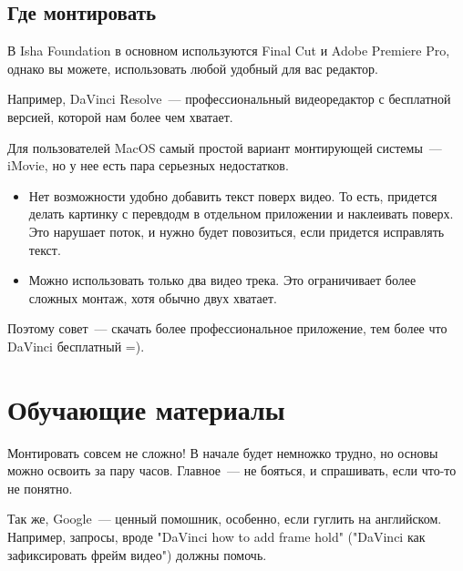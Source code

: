 \documentclass[
a4paper, %
12pt, %
article,
onecolumn, %
openany, %
]{memoir}
\begin{document}
\subsection{Где монтировать}
В Isha Foundation в основном используются Final Cut и Adobe Premiere Pro,
однако вы можете, использовать любой удобный для вас редактор.

Например, DaVinci Resolve~---
профессиональный видеоредактор с бесплатной версией, которой нам более чем хватает.

Для пользователей MacOS самый простой вариант монтирующей системы~---
iMovie, но у нее есть пара серьезных недостатков.
\begin{itemize}
    \item Нет возможности удобно добавить текст поверх видео.
        То есть, придется делать
        картинку с перевдодм в отдельном приложении и наклеивать поверх.
        Это нарушает поток, и нужно будет повозиться, если придется исправлять текст.
    \item Можно использовать только два видео трека. Это ограничивает более
        сложных монтаж, хотя обычно двух хватает.
\end{itemize}
Поэтому совет~--- скачать более профессиональное приложение, тем более что
DaVinci бесплатный =).




\newpage
\section{Обучающие материалы}

Монтировать совсем не сложно! В начале будет немножко трудно, но основы можно
освоить за пару часов. Главное~--- не бояться, и спрашивать, если что-то не понятно.

Так же, Google~--- ценный помошник, особенно, если гуглить на английском.
Например, запросы, вроде
"DaVinci how to add frame hold" ("DaVinci как зафиксировать фрейм видео")
должны помочь.
\end{document}
